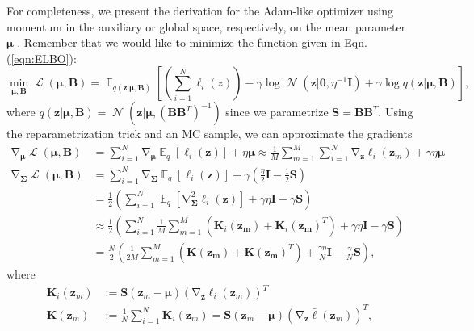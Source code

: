 \documentclass[a4paper, 11pt, oneside]{scrartcl}
\theoremstyle{break}
\DeclareMathOperator{\Normal}{\mathcal{N}}
\DeclareMathOperator{\Expect}{\mathbb{E}}
\DeclareMathOperator{\grad}{\nabla}
\DeclareMathOperator{\ELBO}{\mathcal{L}}
\newcommand{\matr}[1]{\boldsymbol{#1}}
\numberwithin{equation}{section}
\begin{document}
				For completeness, we present the derivation for the Adam-like optimizer using momentum in the auxiliary or global space, respectively, on the mean parameter $\matr{\mu}$ \parencite[Sec. E.3]{LSK20}. 
				Remember that we would like to minimize the function given in Eqn. (\ref{eqn:ELBO}):
				\begin{equation}
					\min_{\matr{\mu}, \matr{B}} \ELBO(\matr{\mu}, \matr{B}) = \Expect_{q(\matr{z} | \matr{\mu}, \matr{B})} \left[ \left( \sum_{i=1}^N \ell_i(z) \right) - \gamma \log \Normal(\matr{z} | \matr{0}, \eta^{-1} \matr{I}) + \gamma \log q(\matr{z} | \matr{\mu}, \matr{B})\right],
					\label{eqn:ELBO_Objective}
				\end{equation}
				where $q(\matr{z} | \matr{\mu}, \matr{B}) = \Normal(\matr{z} | \matr{\mu}, (\matr{B} \matr{B}^T)^{-1})$ since we parametrize $\matr{S} = \matr{B} \matr{B}^T$.
				Using the reparametrization trick and an MC sample, we can approximate the gradients
				\begin{align*}
					\grad_{\matr{\mu}} \ELBO(\matr{\mu}, \matr{B}) &= \sum_{i=1}^N \grad_{\matr{\mu}}\Expect_q[\ell_i (\matr{z})] + \eta \matr{\mu} \approx \frac{1}{M} \sum_{m=1}^M \sum_{i=1}^N \grad_{\matr{z}} \ell_i (\matr{z}_m) + \gamma \eta \matr{\mu} \\
					\grad_{\matr{\Sigma}} \ELBO(\matr{\mu}, \matr{B}) &= \sum_{i=1}^N \grad_{\matr{\Sigma}} \Expect_q[\ell_i (\matr{z})] + \gamma \left( \frac{\eta}{2} \matr{I} - \frac{1}{2} \matr{S} \right) \\
					&= \frac{1}{2} \left( \sum_{i=1}^N \Expect_q[\grad_{\matr{\Sigma}}^2 \ell_i (\matr{z})] + \gamma \eta \matr{I} - \gamma \matr{S} \right) \\
					&\approx \frac{1}{2} \left( \sum_{i=1}^N \frac{1}{M} \sum_{m=1}^M (\matr{K}_i(\matr{z_m}) + \matr{K}_i(\matr{z_m})^T) + \gamma \eta \matr{I} - \gamma \matr{S} \right) \\
					&= \frac{N}{2} \left( \frac{1}{2 M} \sum_{m=1}^M (\matr{K}(\matr{z_m}) + \matr{K}(\matr{z_m})^T) + \frac{\gamma \eta}{N} \matr{I} - \frac{\gamma}{N} \matr{S} \right),
				\end{align*}
				where 
				\begin{align*}
					\matr{K}_i(\matr{z}_m) &:= \matr{S} (\matr{z}_m - \matr{\mu}) (\grad_{\matr{z}} \ell_i (\matr{z}_m) )^T \\
					\matr{K}(\matr{z}_m) &:= \frac{1}{N} \sum_{i=1}^N \matr{K}_i(\matr{z}_m) = \matr{S} (\matr{z}_m - \matr{\mu}) (\grad_{\matr{z}} \bar{\ell} (\matr{z}_m) )^T,
				\end{align*}
\end{document}
